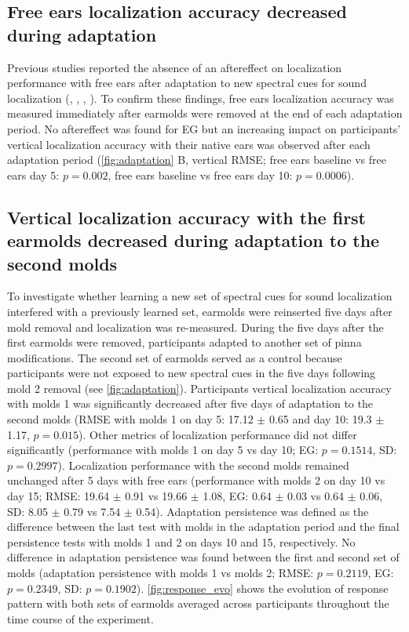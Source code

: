 \subsection{Free ears localization accuracy decreased during adaptation}

Previous studies reported the absence of an aftereffect on localization performance with free ears after adaptation to new spectral cues for sound localization (\citet{hofman_relearning_1998}, \citet{trapeau_fast_2016}, \citet{carlile_relearning_2014}, \citet{wanrooij_relearning_2005}). To confirm these findings, free ears localization accuracy was measured immediately after earmolds were removed at the end of each adaptation period. No aftereffect was found for EG but an increasing impact on participants’ vertical localization accuracy with their native ears was observed after each adaptation period (\cref{fig:adaptation} B, vertical RMSE; free ears baseline vs free ears day 5: $p = 0.002$, free ears baseline vs free ears day 10: $p = 0.0006$). 

\subsection{Vertical localization accuracy with the first earmolds decreased during adaptation to the second molds}

To investigate whether learning a new set of spectral cues for sound localization interfered with a previously learned set, earmolds were reinserted five days after mold removal and localization was re-measured. During the five days after the first earmolds were removed, participants adapted to another set of pinna modifications. The second set of earmolds served as a control because participants were not exposed to new spectral cues in the five days following mold 2 removal (see \cref{fig:adaptation}). Participants vertical localization accuracy with molds 1 was significantly decreased after five days of adaptation to the second molds (RMSE with molds 1 on day 5: 17.12 $\pm$ 0.65 and day 10: 19.3 $\pm$ 1.17, $p = 0.015$). Other metrics of localization performance did not differ significantly (performance with molds 1 on day 5 vs day 10; EG: $p = 0.1514$, SD: $p = 0.2997$). Localization performance with the second molds remained unchanged after 5 days with free ears (performance with molds 2 on day 10 vs day 15; RMSE: 19.64 $\pm$ 0.91 vs 19.66 $\pm$ 1.08, EG:  0.64 $\pm$ 0.03 vs 0.64 $\pm$ 0.06, SD:  8.05 $\pm$ 0.79 vs 7.54 $\pm$ 0.54). Adaptation persistence was defined as the difference between the last test with molds in the adaptation period and the final persistence tests with molds 1 and 2 on days 10 and 15, respectively. No difference in adaptation persistence was found between the first and second set of molds (adaptation persistence with molds 1 vs molds 2; RMSE: $p = 0.2119$, EG: $p = 0.2349$, SD: $p = 0.1902$). \cref{fig:response_evo} shows the evolution of response pattern with both sets of earmolds averaged across participants throughout the time course of the experiment.

